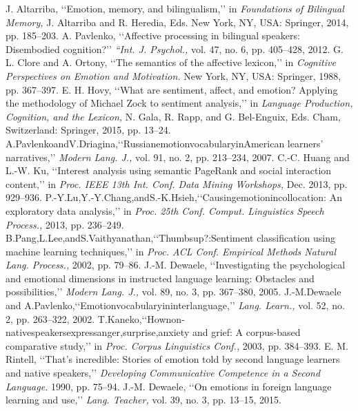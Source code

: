 \documentclass[a4paper,12pt,oneside]{article}
\begin{document}
\newpage
\cleardoublepage
\begin{thebibliography}{9}


 J. Altarriba, ‘‘Emotion, memory, and bilingualism,’’ in \emph{Foundations of Bilingual Memory, }J. Altarriba and R. Heredia, Eds. New York, NY, USA: Springer, 2014, pp. 185–203.
 A. Pavlenko, ‘‘Affective processing in bilingual speakers: Disembodied cognition?’’ \emph{ “Int. J. Psychol., }vol. 47, no. 6, pp. 405–428, 2012.
 G. L. Clore and A. Ortony, ‘‘The semantics of the affective lexicon,’’ in \emph{Cognitive Perspectives on Emotion and Motivation. }New York, NY, USA: Springer, 1988, pp. 367–397.
 E. H. Hovy, ‘‘What are sentiment, affect, and emotion? Applying the methodology of Michael Zock to sentiment analysis,’’ in \emph{Language Production, Cognition, and the Lexicon, }N. Gala, R. Rapp, and G. Bel-Enguix, Eds. Cham, Switzerland: Springer, 2015, pp. 13–24.
 A.PavlenkoandV.Driagina,‘‘RussianemotionvocabularyinAmerican learners’ narratives,’’ \emph{Modern Lang. J., }vol. 91, no. 2, pp. 213–234, 2007.
 C.-C. Huang and L.-W. Ku, ‘‘Interest analysis using semantic PageRank and social interaction content,’’ in \emph{Proc. IEEE 13th Int. Conf. Data Mining Workshops, }Dec. 2013, pp. 929–936.
 P.-Y.Lu,Y.-Y.Chang,andS.-K.Hsieh,‘‘Causingemotionincollocation: An exploratory data analysis,’’ in \emph{Proc. 25th Conf. Comput. Linguistics Speech Process.,} 2013, pp. 236–249.
 B.Pang,L.Lee,andS.Vaithyanathan,‘‘Thumbsup?:Sentiment classification using machine learning techniques,’’ in \emph{Proc. ACL Conf. Empirical Methods Natural Lang. Process.,} 2002, pp. 79–86.
 J.-M. Dewaele, ‘‘Investigating the psychological and emotional dimensions in instructed language learning: Obstacles and possibilities,’’ \emph{Modern Lang. J.,} vol. 89, no. 3, pp. 367–380, 2005.
 J.-M.Dewaele and A.Pavlenko,‘‘Emotionvocabularyininterlanguage,’’ \emph{Lang. Learn.,} vol. 52, no. 2, pp. 263–322, 2002.
 T.Kaneko,‘‘Hownon-nativespeakersexpressanger,surprise,anxiety and grief: A corpus-based comparative study,’’ in \emph{Proc. Corpus Linguistics Conf.,} 2003, pp. 384–393.
 E. M. Rintell, ‘‘That’s incredible: Stories of emotion told by second language learners and native speakers,’’ \emph{Developing Communicative Competence in a Second Language.} 1990, pp. 75–94.
 J.-M. Dewaele, ‘‘On emotions in foreign language learning and use,’’ \emph{Lang. Teacher,} vol. 39, no. 3, pp. 13–15, 2015.

\end{thebibliography}
\end{document}
